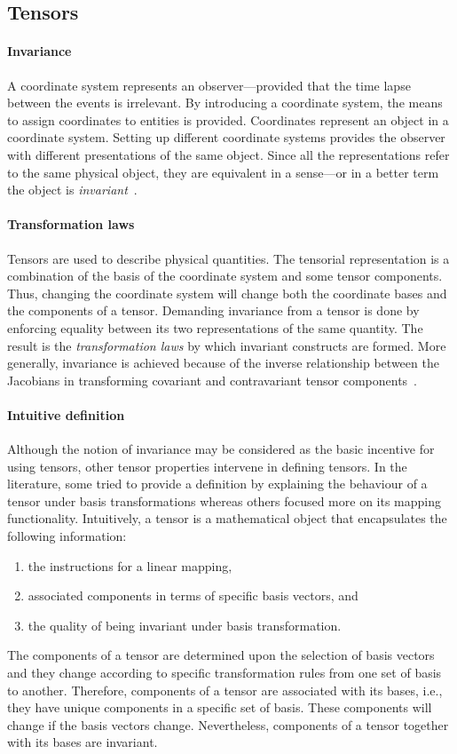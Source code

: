 \subsection{Tensors}
    \paragraph{Invariance} A coordinate system represents an observer---provided that the time lapse between the events is irrelevant. By introducing a coordinate system, the means to assign coordinates to entities is provided. Coordinates represent an object in a coordinate system. Setting up different coordinate systems provides the observer with different presentations of the same object. Since all the representations refer to the same physical object, they are equivalent in a sense---or in a better term the object is \textit{invariant}~\autocite{Jaunzemis.1967}. 

    \paragraph{Transformation laws} Tensors are used to describe physical quantities. The tensorial representation is a combination of the basis of the coordinate system and some tensor components. Thus, changing the coordinate system will change both the coordinate bases and the components of a tensor. Demanding invariance from a tensor is done by enforcing equality between its two representations of the same quantity. The result is the \textit{transformation laws} by which invariant constructs are formed. More generally, invariance is achieved because of the inverse relationship between the Jacobians in transforming covariant and contravariant tensor components~\autocite{Grinfeld.2013}.

    \paragraph{Intuitive definition} Although the notion of invariance may be considered as the basic incentive for using tensors, other tensor properties intervene in defining tensors. In the literature, some tried to provide a definition by explaining the behaviour of a tensor under basis transformations whereas others focused more on its mapping functionality. Intuitively, a tensor is a mathematical object that encapsulates the following information:
    \begin{enumerate}
        \item the instructions for a linear mapping,
        \item associated components in terms of specific basis vectors, and
        \item the quality of being invariant under basis transformation.
    \end{enumerate}
    The components of a tensor are determined upon the selection of basis vectors and they change according to specific transformation rules from one set of basis to another. Therefore, components of a tensor are associated with its bases, i.e., they have unique components in a specific set of basis. These components will change if the basis vectors change. Nevertheless, components of a tensor together with its bases are invariant.
    
